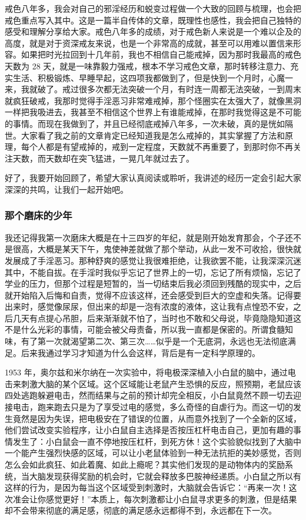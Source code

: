 戒色八年多，我会对自己的邪淫经历和蜕变过程做一个大致的回顾与梳理，也会把戒色重点写入其中。这是一篇半自传体的文章，既理性也感性，我会把自己独特的感受和理解分享给大家。戒色八年多的成绩，对于戒色新人来说是一个难以企及的高度，就是对于资深戒友来说，也是一个非常高的成就，甚至可以用难以置信来形容。如果把时光拉回到十几年前，我也不相信自己能戒掉，因为那时我最高的戒色天数为 28 天，就是一味靠毅力强戒，根本不学习戒色文章，那时转移注意力、充实生活、积极锻炼、早睡早起，这四项我都做到了，但是快到一个月时，心魔一来，我就破了。戒过很多次都无法突破一个月，有时连一周都无法突破，一到周末就疯狂破戒，我那时觉得手淫恶习非常难戒掉，那个怪圈实在太强大了，就像黑洞一样把我吸进去，我甚至不相信这个世界上有谁能戒掉，在那时我觉得这是不可能的事情。而现在我做到了，并且已经彻底戒掉八年多，一次未破，真的是恍如隔世。大家看了我之前的文章肯定已经知道我是怎么戒掉的，其实掌握了方法和原理，每个人都是有望戒掉的，戒到一定程度，天数就不再重要了，到那时你不再关注天数，而天数却在突飞猛进，一晃几年就过去了。

好了，我要开始回顾了，希望大家认真阅读或聆听，我讲述的经历一定会引起大家深深的共鸣，让我们一起开始吧。

\subsubsection{那个磨床的少年}

我还记得我第一次磨床大概是在十三四岁的年纪，就是刚开始发育那会，个子还不是很高，大概是某天下午，鬼使神差就做了那个举动，从此一发不可收拾，很快就发展成了手淫恶习。那种舒爽的感觉让我很难拒绝，让我欲罢不能，让我深深沉迷其中，不能自拔。在手淫时我似乎忘记了世界上的一切，忘记了所有烦恼，忘记了学业的压力，但那个过程是短暂的，当一切结束后我必须回到残酷的现实中，之后就开始陷入后悔和自责，觉得不应该这样，还会感受到巨大的空虚和失落。记得要出来时，感觉像尿尿，但出来的却是一泡有浓度的液体，这让我有点惶恐不安，之后几天有点提心吊胆，后来渐渐就不怕了，当时也不敢和父母说，毕竟隐隐知道这不是什么光彩的事情，可能会被父母责备，所以我一直都是保密的。所谓食髓知味，有了第一次就渴望第二次、第三次……似乎是一个无底洞，永远也无法彻底满足。后来我通过学习才知道为什么会这样，背后是有一定科学原理的。

1953 年，奥尔兹和米尔纳在一次实验中，将电极深深植入小白鼠的脑中，通过电击来刺激大脑的某个区域。这个区域能让老鼠产生恐惧的反应，照预期，老鼠应该四处逃跑躲避电击，然而结果与之前的预计却完全相反，小白鼠竟然不顾一切去迎接电击，跑来跑去只是为了享受过电的感觉，多么奇怪的自虐行为。而这一切的发生竟然是因为失误，把电极安在了错误的位置，从而意外找到了一个全新的区域，他们尝试改变实验程序，让小白鼠自主选择是否按压杠杆电击自己，更加有趣的事情发生了：小白鼠会一直不停地按压杠杆，到死方休！这个实验貌似找到了大脑中一个能产生强烈快感的区域，可以让小老鼠体验到一种无法抗拒的美妙感觉，否则怎么会如此疯狂、如此着魔、如此上瘾呢？其实他们发现的是动物体内的奖励系统，当大脑发现获得奖励的机会时，它就会释放多巴胺神经递质。小白鼠之所以有这样的行为，是因为每当这个区域受到刺激时，大脑就会告诉它：“再来一次！这次准会让你感觉更好！”本质上，每次刺激都让小白鼠寻求更多的刺激，但是结果却不会带来彻底的满足感，彻底的满足感永远都得不到，永远都在下一次。

